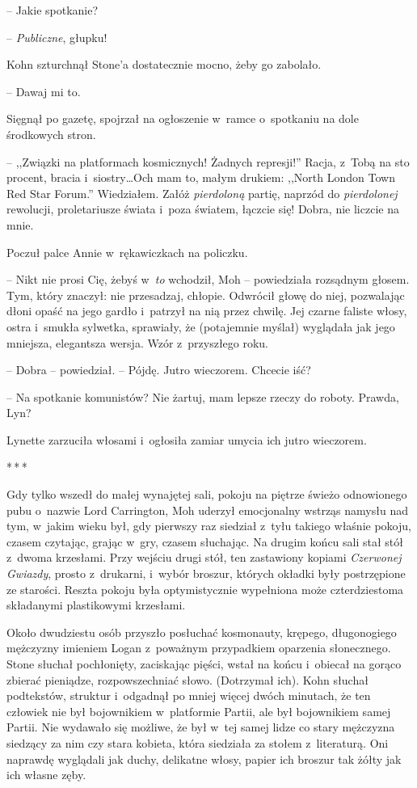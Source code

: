 \documentclass[oneside,polish,11pt,sfheadings]{mwbk}
\newcommand{\threeast}{\bigskip\par\centerline{*\,*\,*}\medskip\par}%
\begin{document}
-- Jakie spotkanie?

-- \emph{Publiczne}, głupku!

Kohn szturchnął Stone'a dostatecznie mocno, żeby go zabolało. 

-- Dawaj mi to.

Sięgnął po gazetę, spojrzał na ogłoszenie w~ramce o~spotkaniu na dole
środkowych stron. 

-- ,,Związki na platformach kosmicznych! Żadnych
represji!'' Racja, z~Tobą na sto procent, bracia i~siostry\ldots Och mam to,
małym drukiem: ,,North London Town Red Star Forum.'' Wiedziałem. Załóż
\emph{pierdoloną} partię, naprzód do \emph{pierdolonej} rewolucji,
proletariusze świata i~poza światem, łączcie się! Dobra, nie liczcie na
mnie.

Poczuł palce Annie w~rękawiczkach na policzku. 

-- Nikt nie prosi Cię,
żebyś w~\emph{to} wchodził, Moh -- powiedziała rozsądnym głosem. Tym,
który znaczył: nie przesadzaj, chłopie. Odwrócił głowę do niej,
pozwalając dłoni opaść na jego gardło i~patrzył na nią przez chwilę. Jej
czarne faliste włosy, ostra i~smukła sylwetka, sprawiały, że (potajemnie
myślał) wyglądała jak jego mniejsza, elegantsza wersja. Wzór z~przyszłego roku.

-- Dobra -- powiedział. -- Pójdę. Jutro wieczorem. Chcecie iść?

-- Na spotkanie komunistów? Nie żartuj, mam lepsze rzeczy do roboty.
Prawda, Lyn?

Lynette zarzuciła włosami i~ogłosiła zamiar umycia ich jutro wieczorem.
  \threeast 

Gdy tylko wszedł do małej wynajętej sali, pokoju na piętrze świeżo
odnowionego pubu o~nazwie Lord Carrington, Moh uderzył emocjonalny
wstrząs namysłu nad tym, w~jakim wieku był, gdy pierwszy raz siedział z~tyłu takiego właśnie pokoju, czasem czytając, grając w~gry, czasem
słuchając. Na drugim końcu sali stał stół z~dwoma krzesłami. Przy
wejściu drugi stół, ten zastawiony kopiami \emph{Czerwonej Gwiazdy},
prosto z~drukarni, i~wybór broszur, których okładki były postrzępione ze
starości. Reszta pokoju była optymistycznie wypełniona może
czterdziestoma składanymi plastikowymi krzesłami.

Około dwudziestu osób przyszło posłuchać kosmonauty, krępego,
długonogiego mężczyzny imieniem Logan z~poważnym przypadkiem oparzenia
słonecznego. Stone słuchał pochłonięty, zaciskając pięści, wstał na
końcu i~obiecał na gorąco zbierać pieniądze, rozpowszechniać słowo.
(Dotrzymał ich). Kohn słuchał podtekstów, struktur i~odgadnął po mniej
więcej dwóch minutach, że ten człowiek nie był bojownikiem w~platformie
Partii, ale był bojownikiem samej Partii. Nie wydawało się możliwe, że
był w~tej samej lidze co stary mężczyzna siedzący za nim czy stara
kobieta, która siedziała za stołem z~literaturą. Oni naprawdę wyglądali
jak duchy, delikatne włosy, papier ich broszur tak żółty jak ich własne
zęby.
\end{document}
